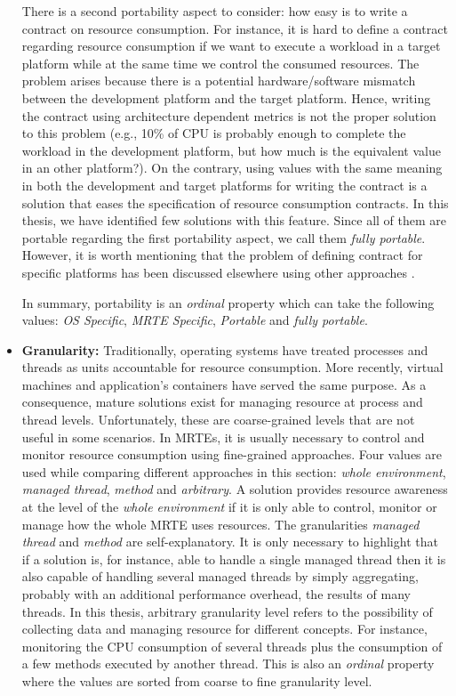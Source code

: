 \begin{itemize}
There is a second portability aspect to consider: how easy is to write a contract on resource consumption.
For instance, it is hard to define a contract regarding resource consumption if we want to execute a workload in a target platform while at the same time we control the consumed resources.
The problem arises because there is a potential hardware/software mismatch between the development platform and the target platform.
Hence, writing the contract using architecture dependent metrics is not the proper solution to this problem \cite{no se} (e.g., 10\% of CPU is probably enough to complete the workload in the development platform, but how much is the equivalent value in an other platform?).
On the contrary, using values with the same meaning in both the development and target platforms for writing the contract is a solution that eases the specification of resource consumption contracts.
In this thesis, we have identified few solutions with this feature.
Since all of them are portable regarding the first portability aspect, we call them \textit{fully portable}.
However, it is worth mentioning that the problem of defining contract for specific platforms has been discussed elsewhere using other approaches \cite{otros}.

In summary, portability is an \textit{ordinal} property which can take the following values: \textit{OS Specific}, \textit{MRTE Specific}, \textit{Portable} and  \textit{fully portable}.

\item \textbf{Granularity:}
Traditionally, operating systems have treated processes and threads as units accountable for resource consumption.
More recently, virtual machines and application's containers have served the same purpose.
As a consequence, mature solutions exist for managing resource at process and thread levels.
Unfortunately, these are coarse-grained levels that are not useful in some scenarios.
In MRTEs, it is usually necessary to control and monitor resource consumption using fine-grained approaches.
Four values are used while comparing different approaches in this section: \textit{whole environment}, \textit{managed thread}, \textit{method} and \textit{arbitrary}.
A solution provides resource awareness at the level of the \textit{whole environment} if it is only able to control, monitor or manage how the whole MRTE uses resources.
The granularities \textit{managed thread} and \textit{method} are self-explanatory.
It is only necessary to highlight that if a solution is, for instance, able to handle a single managed thread then it is also capable of handling several managed threads by simply aggregating, probably with an additional performance overhead, the results of many threads.
In this thesis, arbitrary granularity level refers to the possibility of collecting data and managing resource for different concepts.
For instance, monitoring the CPU consumption of several threads plus the consumption of a few methods executed by another thread.
This is also an \textit{ordinal} property where the values are sorted from coarse to fine granularity level.


\end{itemize}
